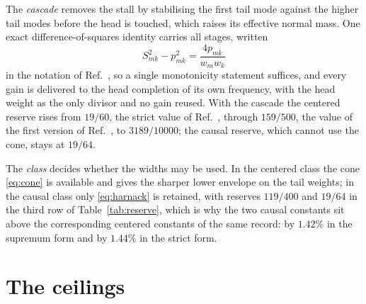 \documentclass[aps,10pt,superscriptaddress,floatfix,amsmath,amssymb,nofootinbib]{revtex4-2}
\begin{document}
The \emph{cascade} removes the stall by stabilising the first tail mode against the higher
tail modes before the head is touched, which raises its effective normal mass. One exact
difference-of-squares identity carries all stages, written
\begin{equation}\label{eq:cascade}
S_{mk}^{2}-p_{mk}^{2}=\frac{4p_{mk}}{w_mw_k}
\end{equation}
in the notation of Ref.~\cite{finiteenergy}, so a single monotonicity statement suffices,
and every gain is delivered to the head completion of its own frequency, with the head
weight as the only divisor and no gain reused. With the cascade the centered reserve rises
from $19/60$, the strict value of Ref.~\cite{finiteenergy}, through $159/500$, the value of
the first version of Ref.~\cite{anisosharp}, to $3189/10000$; the causal reserve, which
cannot use the cone, stays at $19/64$.

The \emph{class} decides whether the widths may be used. In the centered class the cone
\eqref{eq:cone} is available and gives the sharper lower envelope on the tail weights; in
the causal class only \eqref{eq:harnack} is retained, with reserves $119/400$ and $19/64$
in the third row of Table~\ref{tab:reserve}, which is why the two causal constants sit
above the corresponding centered constants of the same record: by $1.42\%$ in the
supremum form and by $1.44\%$ in the strict form.

\section{The ceilings}\label{sec:ceilings}
\end{document}
